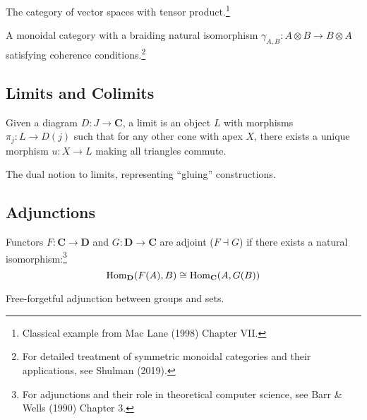 \begin{example}
The category of vector spaces with tensor product.\footnote{Classical example from Mac Lane (1998) Chapter VII.}
\end{example}

\begin{definition}
A monoidal category with a braiding natural isomorphism $\gamma_{A,B}: A \otimes B \to B \otimes A$ satisfying coherence conditions.\footnote{For detailed treatment of symmetric monoidal categories and their applications, see Shulman (2019).}
\end{definition}

\subsection{Limits and Colimits}

\begin{definition}[Limit]
Given a diagram $D: J \to \mathbf{C}$, a limit is an object $L$ with morphisms $\pi_j: L \to D(j)$ such that for any other cone with apex $X$, there exists a unique morphism $u: X \to L$ making all triangles commute.
\end{definition}

\begin{definition}[Colimit]
The dual notion to limits, representing ``gluing'' constructions.
\end{definition}

\subsection{Adjunctions}

\begin{definition}[Adjunction]
Functors $F: \mathbf{C} \to \mathbf{D}$ and $G: \mathbf{D} \to \mathbf{C}$ are adjoint ($F \dashv G$) if there exists a natural isomorphism:\footnote{For adjunctions and their role in theoretical computer science, see Barr \& Wells (1990) Chapter 3.}
\begin{equation}
\mathrm{Hom}_{\mathbf{D}}(F(A), B) \cong \mathrm{Hom}_{\mathbf{C}}(A, G(B))
\end{equation}
\end{definition}

\begin{example}
Free-forgetful adjunction between groups and sets.
\end{example}

\newpage

